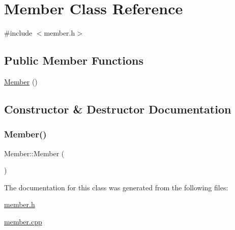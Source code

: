 \hypertarget{class_member}{}\section{Member Class Reference}
\label{class_member}


{\ttfamily \#include $<$member.\+h$>$}

\subsection*{Public Member Functions}
\begin{DoxyCompactItemize}
\item 
\hyperlink{class_member_a44241aa6aa9b792b550d9cc29e7ad050}{Member} ()
\end{DoxyCompactItemize}


\subsection{Constructor \& Destructor Documentation}
\mbox{\label{class_member_a44241aa6aa9b792b550d9cc29e7ad050}} 
\subsubsection{\texorpdfstring{Member()}{Member()}}
{\footnotesize\ttfamily Member\+::\+Member (\begin{DoxyParamCaption}{ }\end{DoxyParamCaption})}



The documentation for this class was generated from the following files\+:\begin{DoxyCompactItemize}
\item 
\hyperlink{member_8h}{member.\+h}\item 
\hyperlink{member_8cpp}{member.\+cpp}\end{DoxyCompactItemize}

